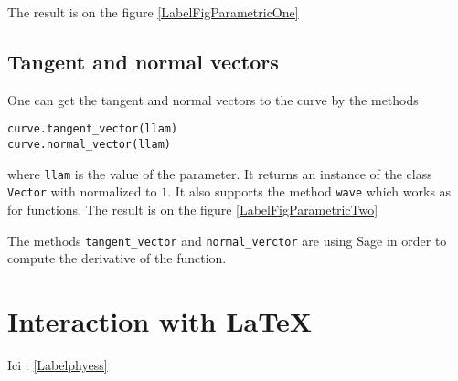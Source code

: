 The result is on the figure \ref{LabelFigParametricOne}
\newcommand{\CaptionFigParametricOne}{An example of parametric curve.}


\subsection{Tangent and normal vectors}

One can get the tangent and normal vectors to the curve by the methods
\begin{verbatim}
curve.tangent_vector(llam)
curve.normal_vector(llam)
\end{verbatim}
where \verb+llam+ is the value of the parameter. It returns an instance of the class \verb+Vector+ with normalized to $1$. It also supports the method \verb+wave+ which works as for functions.
The result is on the figure \ref{LabelFigParametricTwo}
\newcommand{\CaptionFigParametricTwo}{An other example of parametric curve. Si je voulais troller, j'offrirais un casier de trapistes à qui ferait cette figure en \LaTeX-pstricks pur sans faire appel à des programmes externes.}


The methods \verb+tangent_vector+ and \verb+normal_verctor+ are using Sage in order to compute the derivative of the function.

\section{Interaction with \LaTeX}



\setcounter{phyess}{\value{equation}}
\label{Labelphyess}

Ici : \ref{Labelphyess}




